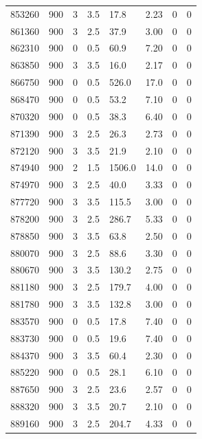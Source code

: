 \documentclass[preview]{standalone}
\begin{document}
{{{{{{{{{{\begin{tabular}{L{1.2cm}C{1.2cm} C{0.3cm}C{0.5cm} C{1.4cm}C{1.4cm} C{1.4cm}C{1.4cm}}
  853260  &   900  & 3     & 3.5 &  17.8  & 2.23  & 0 &  0   \\ 
  861360  &   900  & 3     & 2.5 &  37.9  & 3.00  & 0 &  0   \\ 
  862310  &   900  & 0     & 0.5 &  60.9  & 7.20  & 0 &  0   \\ 
  863850  &   900  & 3     & 3.5 &  16.0  & 2.17  & 0 &  0   \\ 
  866750  &   900  & 0     & 0.5 &  526.0  & 17.0  & 0 &  0   \\ 
  868470  &   900  & 0     & 0.5 &  53.2  & 7.10  & 0 &  0   \\ 
  870320  &   900  & 0     & 0.5 &  38.3  & 6.40  & 0 &  0   \\ 
  871390  &   900  & 3     & 2.5 &  26.3  & 2.73  & 0 &  0   \\ 
  872120  &   900  & 3     & 3.5 &  21.9  & 2.10  & 0 &  0   \\ 
  874940  &   900  & 2     & 1.5 &  1506.0  & 14.0  & 0 &  0   \\ 
  874970  &   900  & 3     & 2.5 &  40.0  & 3.33  & 0 &  0   \\ 
  877720  &   900  & 3     & 3.5 &  115.5  & 3.00  & 0 &  0   \\ 
  878200  &   900  & 3     & 2.5 &  286.7  & 5.33  & 0 &  0   \\ 
  878850  &   900  & 3     & 3.5 &  63.8  & 2.50  & 0 &  0   \\ 
  880070  &   900  & 3     & 2.5 &  88.6  & 3.30  & 0 &  0   \\ 
  880670  &   900  & 3     & 3.5 &  130.2  & 2.75  & 0 &  0   \\ 
  881180  &   900  & 3     & 2.5 &  179.7  & 4.00  & 0 &  0   \\ 
  881780  &   900  & 3     & 3.5 &  132.8  & 3.00  & 0 &  0   \\ 
  883570  &   900  & 0     & 0.5 &  17.8  & 7.40  & 0 &  0   \\ 
  883730  &   900  & 0     & 0.5 &  19.6  & 7.40  & 0 &  0   \\ 
  884370  &   900  & 3     & 3.5 &  60.4  & 2.30  & 0 &  0   \\ 
  885220  &   900  & 0     & 0.5 &  28.1  & 6.10  & 0 &  0   \\ 
  887650  &   900  & 3     & 2.5 &  23.6  & 2.57  & 0 &  0   \\ 
  888320  &   900  & 3     & 3.5 &  20.7  & 2.10  & 0 &  0   \\ 
  889160  &   900  & 3     & 2.5 &  204.7  & 4.33  & 0 &  0   \\ 
\hline 
\end{tabular} 

}}}}}}}}}}
\end{document}
